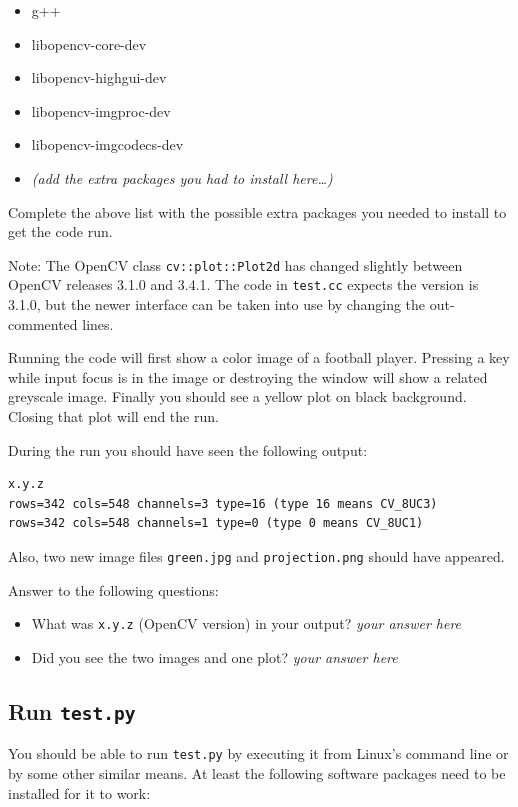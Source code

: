 \documentclass{article}
\begin{document}
\begin{itemize}
\item g++
\item libopencv-core-dev
\item libopencv-highgui-dev
\item libopencv-imgproc-dev
\item libopencv-imgcodecs-dev
\item \emph{(add the extra packages you had to install here\ldots)}
\end{itemize}

Complete the above list with the possible extra packages you needed
to install to get the code run.

Note: The OpenCV class \texttt{cv::plot::Plot2d} has changed slightly
between OpenCV releases 3.1.0 and 3.4.1.  The code in \texttt{test.cc}
expects the version is 3.1.0, but the newer interface can be taken
into use by changing the out-commented lines.

Running the code will first show a color image of a football player.
Pressing a key while input focus is in the image or destroying the
window will show a related greyscale image.  Finally you should see a
yellow plot on black background.  Closing that plot will end the run.

During the run you should have seen the following output:

\begin{verbatim}
x.y.z
rows=342 cols=548 channels=3 type=16 (type 16 means CV_8UC3)
rows=342 cols=548 channels=1 type=0 (type 0 means CV_8UC1)
\end{verbatim}

Also, two new image files \texttt{green.jpg} and
\texttt{projection.png} should have appeared.

Answer to the following questions:

\begin{itemize}
\item What was \texttt{x.y.z} (OpenCV version) in your output? \emph{your answer here} 
\item Did you see the two images and one plot? \emph{your answer here} 
\end{itemize}


\subsection{Run \texttt{test.py}}

You should be able to run \texttt{test.py} by executing it from
Linux's command line or by some other similar means.  At least the
following software packages need to be installed for it to work:
\end{document}
